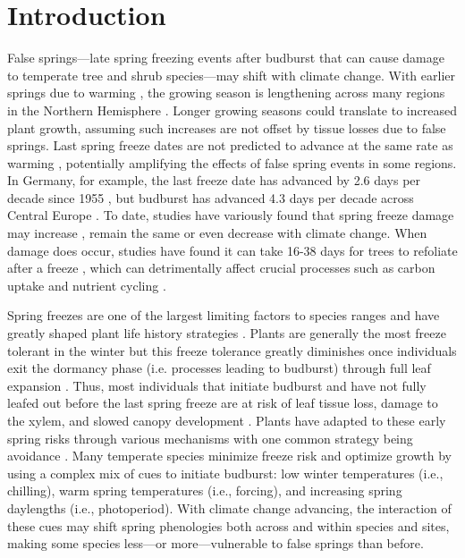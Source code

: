 \documentclass{article}\usepackage[]{graphicx}\usepackage[]{color}
\newcommand{\R}[1]{\label{#1}\linelabel{#1}}
\begin{document}
\section*{Introduction} %
False springs---late spring freezing events after budburst that can cause damage to temperate tree and shrub species---may shift with climate change. With earlier springs due to warming \citep{Wolkovich2012,IPCC2014}, the growing season is lengthening across many regions in the Northern Hemisphere \citep{Chen2005,Liu2006, Kukal2018}. Longer growing seasons could translate to increased plant growth, assuming such increases are not offset by tissue losses due to false springs. Last spring freeze dates are not predicted to advance at the same rate as warming \citep{Inouye2008,Martin2010,Labe2016,Wypych2016a,Sgubin2018}, potentially amplifying the effects of false spring events in some regions. \R{Zbbrefbegin} In Germany, for example, the last freeze date has advanced by 2.6 days per decade since 1955 \citep{Zohner2016}, but budburst has advanced 4.3 days per decade across Central Europe \citep{Fu2014,Vitasse2018}.\R{Zbbrefbegin} To date, studies have variously found that spring freeze damage may increase \citep{Hannenin1991,Augspurger2013,Labe2016}, remain the same \citep{Scheifinger2003} or even decrease \citep{Kramer1994, Vitra2017} with climate change. When damage does occur, studies have found it can take 16-38 days for trees to refoliate after a freeze \citep{Gu2008,Augspurger2009, Augspurger2013, Menzel2015}, which can detrimentally affect crucial processes such as carbon uptake and nutrient cycling \citep{Hufkens2012,Richardson2013,Klosterman2018}.  

Spring freezes are one of the largest limiting factors to species ranges and have greatly shaped plant life history strategies \citep{Kollas2014}. Plants are generally the most freeze tolerant in the winter but this freeze tolerance greatly diminishes once individuals exit the dormancy phase (i.e. processes leading to budburst) through full leaf expansion \citep{Vitasse2014,Lenz2016}. Thus, most individuals that initiate budburst and have not fully leafed out before the last spring freeze are at risk of leaf tissue loss, damage to the xylem, and slowed canopy development \citep{Gu2008,Hufkens2012}. Plants have adapted to these early spring risks through various mechanisms with one common strategy being avoidance \citep{Vitasse2014}. Many temperate species minimize freeze risk and optimize growth by using a complex mix of cues to initiate budburst: low winter temperatures (i.e., chilling), warm spring temperatures (i.e., forcing), and increasing spring daylengths (i.e., photoperiod). With climate change advancing, the interaction of these cues may shift spring phenologies both across and within species and sites, making some species less---or more---vulnerable to false springs than before. \\
\end{document}
